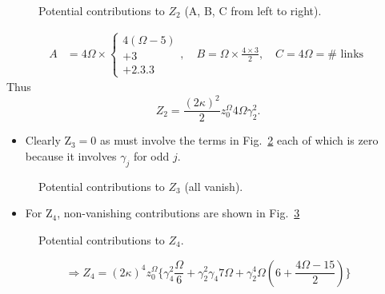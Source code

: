 \begin{itemize}
\begin{figure}
    \centering
    \caption{Potential contributions to $Z_2$ (A, B, C from left to right).
    \label{fig:hopping_Z2}}
\end{figure}

\begin{equation}
\begin{aligned}
A & =4 \Omega \times\left\{\begin{array}{l}
4(\Omega-5) \\
+3\\
+2.3 .3
\end{array}, 
\quad B=\Omega \times \frac{4 \times 3}{2},
\quad C=4 \Omega=\#\right. \text { links }
\end{aligned}
\end{equation}
Thus
\begin{equation}
 Z_{2}  =\frac{(2 \kappa)^{2}}{2} z_{0}^{\Omega} 4 \Omega \gamma_{2}^{2}.
\end{equation}

\begin{itemize}
  \item Clearly \(\mathrm{Z}_{3}=0\) as must involve the terms in Fig.~\ref{fig:hopping_Z3} each of which is zero because it involves $\gamma_j$ for odd $j$.
\end{itemize}

\begin{figure}
    \centering
    \caption{Potential contributions to $Z_3$ (all vanish).
    \label{fig:hopping_Z3}}
\end{figure}



\begin{itemize}
  \item For \(\mathrm{Z}_{4}\), non-vanishing contributions are shown in Fig.~\ref{fig:hopping_Z4}
\end{itemize}
\begin{figure}
    \centering
    \caption{Potential contributions to $Z_4$.
    \label{fig:hopping_Z4}}
\end{figure}

\begin{equation}
    \Rightarrow Z_4 = (2 \kappa)^4 z_0^\Omega \{ \gamma_4^2 \frac{\Omega}{6} + \gamma_2^2 \gamma_4 7 \Omega + \gamma_2^4 \Omega\left(6 + \frac{4 \Omega - 15}{2}\right)\}
\end{equation}
\\


\end{itemize}
